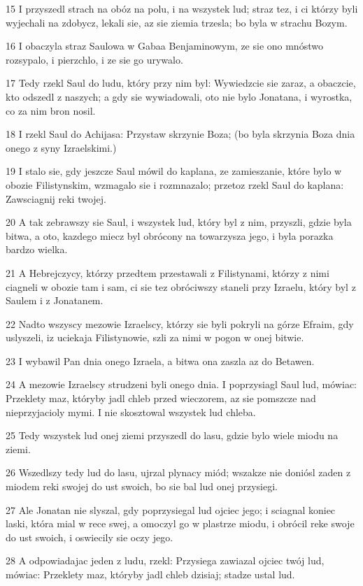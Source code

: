 \par 15 I przyszedl strach na obóz na polu, i na wszystek lud; straz tez, i ci którzy byli wyjechali na zdobycz, lekali sie, az sie ziemia trzesla; bo byla w strachu Bozym.
\par 16 I obaczyla straz Saulowa w Gabaa Benjaminowym, ze sie ono mnóstwo rozsypalo, i pierzchlo, i ze sie go urywalo.
\par 17 Tedy rzekl Saul do ludu, który przy nim byl: Wywiedzcie sie zaraz, a obaczcie, kto odszedl z naszych; a gdy sie wywiadowali, oto nie bylo Jonatana, i wyrostka, co za nim bron nosil.
\par 18 I rzekl Saul do Achijasa: Przystaw skrzynie Boza; (bo byla skrzynia Boza dnia onego z syny Izraelskimi.)
\par 19 I stalo sie, gdy jeszcze Saul mówil do kaplana, ze zamieszanie, które bylo w obozie Filistynskim, wzmagalo sie i rozmnazalo; przetoz rzekl Saul do kaplana: Zawsciagnij reki twojej.
\par 20 A tak zebrawszy sie Saul, i wszystek lud, który byl z nim, przyszli, gdzie byla bitwa, a oto, kazdego miecz byl obrócony na towarzysza jego, i byla porazka bardzo wielka.
\par 21 A Hebrejczycy, którzy przedtem przestawali z Filistynami, którzy z nimi ciagneli w obozie tam i sam, ci sie tez obróciwszy staneli przy Izraelu, który byl z Saulem i z Jonatanem.
\par 22 Nadto wszyscy mezowie Izraelscy, którzy sie byli pokryli na górze Efraim, gdy uslyszeli, iz uciekaja Filistynowie, szli za nimi w pogon w onej bitwie.
\par 23 I wybawil Pan dnia onego Izraela, a bitwa ona zaszla az do Betawen.
\par 24 A mezowie Izraelscy strudzeni byli onego dnia. I poprzysiagl Saul lud, mówiac: Przeklety maz, któryby jadl chleb przed wieczorem, az sie pomszcze nad nieprzyjacioly mymi. I nie skosztowal wszystek lud chleba.
\par 25 Tedy wszystek lud onej ziemi przyszedl do lasu, gdzie bylo wiele miodu na ziemi.
\par 26 Wszedlszy tedy lud do lasu, ujrzal plynacy miód; wszakze nie doniósl zaden z miodem reki swojej do ust swoich, bo sie bal lud onej przysiegi.
\par 27 Ale Jonatan nie slyszal, gdy poprzysiegal lud ojciec jego; i sciagnal koniec laski, która mial w rece swej, a omoczyl go w plastrze miodu, i obrócil reke swoje do ust swoich, i oswiecily sie oczy jego.
\par 28 A odpowiadajac jeden z ludu, rzekl: Przysiega zawiazal ojciec twój lud, mówiac: Przeklety maz, któryby jadl chleb dzisiaj; stadze ustal lud.
